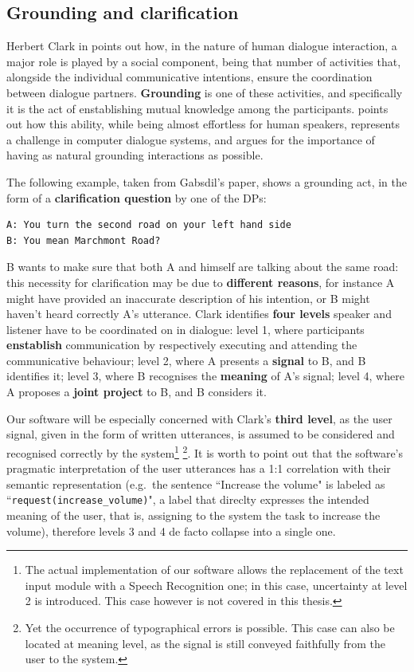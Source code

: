 \subsection{Grounding and clarification}\label{ch:rw:ds:grounding}
Herbert Clark in \cite{clark_1996} points out how, in the nature of human dialogue interaction, a major role is played by a social component, being that number of activities that, alongside the individual communicative intentions, ensure the coordination between dialogue partners. \textbf{Grounding} is one of these activities, and specifically it is the act of enstablishing mutual knowledge among the participants. \cite{Gabsdil03clarificationin} points out how this ability, while being almost effortless for human speakers, represents a challenge in computer dialogue systems, and argues for the importance of having as natural grounding interactions as possible.

The following example, taken from Gabsdil's paper, shows a grounding act, in the form of a \textbf{clarification question} by one of the DPs:
\begin{verbatim}
A: You turn the second road on your left hand side
B: You mean Marchmont Road?
\end{verbatim}
B wants to make sure that both A and himself are talking about the same road: this necessity for clarification may be due to \textbf{different reasons}, for instance A might have provided an inaccurate description of his intention, or B might haven't heard correctly A's utterance. Clark identifies \textbf{four levels} speaker and listener have to be coordinated on in dialogue: level 1, where participants \textbf{enstablish} communication by respectively executing and attending the communicative behaviour; level 2, where A presents a \textbf{signal} to B, and B identifies it; level 3, where B recognises the \textbf{meaning} of A's signal; level 4, where A proposes a \textbf{joint project} to B, and B considers it.

Our software will be especially concerned with Clark's \textbf{third level}, as the user signal, given in the form of written utterances, is assumed to be considered and recognised correctly by the system\footnote{The actual implementation of our software allows the replacement of the text input module with a Speech Recognition one; in this case, uncertainty at level 2 is introduced. This case however is not covered in this thesis.} \footnote{Yet the occurrence of typographical errors is possible. This case can also be located at meaning level, as the signal is still conveyed faithfully from the user to the system.}. It is worth to point out that the software's pragmatic interpretation of the user utterances has a 1:1 correlation with their semantic representation (e.g.\ the sentence ``Increase the volume" is labeled as ``\texttt{request(increase\_volume)}", a label that direclty expresses the intended meaning of the user, that is, assigning to the system the task to increase the volume), therefore levels 3 and 4 de facto collapse into a single one.

